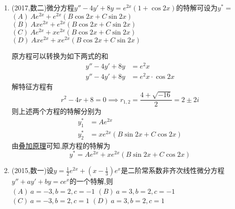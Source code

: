 \documentclass[12pt, a4paper, oneside, UTF8]{ctexbook}
\begin{document}
\begin{enumerate}[label=\arabic*.,start=8]
    \item (2017,数二)微分方程$y''-4y'+8y=e^{2x}(1+\cos2x)$的特解可设为$y^*=$ \\
        $(A)\ Ae^{2x}+e^{2x}(B\cos2x+C\sin2x)$ \\
        $(B)\ Axe^{2x}+e^{2x}(B\cos2x+C\sin2x)$ \\
        $(C)\ Ae^{2x}+xe^{2x}(B\cos2x+C\sin2x)$ \\
        $(D)\ Axe^{2x}+xe^{2x}(B\cos2x+C\sin2x)$
    
    \begin{solution}
    原方程可以转换为如下两式的和
    \begin{align}
        y'' - 4y' + 8y &= e^2x \\
        y'' - 4y' + 8y &= e^2x\cdot\cos{2x}
    \end{align}
    解特征方程有
    $$
    r^2-4r+8=0 \implies r_{1,2}=\frac{4+\sqrt{-16}}{2}=2\pm 2i
    $$
    则上述两个方程的特解分别为
    \begin{align*}
        y_1^{*} &=Ae^{2x} \\
        y_2^{*} &=xe^{2x}(B\sin{2x}+C\cos{2x}) 
    \end{align*}
    由\underline{叠加原理}可知,原方程的特解为
    $$
    y^{*}=Ae^{2x}+xe^{2x}(B\sin{2x}+C\cos{2x}) 
    $$
    \end{solution}
    
    \item (2015,数一)设$y=\frac{1}{2}e^{2x}+(x-\frac{1}{3})e^x$是二阶常系数非齐次线性微分方程$y''+ay'+by=ce^x$的一个特解,则 \\
    $(A)\ a=-3,b=2,c=-1$ \qquad
    $(B)\ a=3,b=2,c=-1$ \\
    $(C)\ a=-3,b=2,c=1$ \qquad
    $(D)\ a=3,b=2,c=1$ 
    

\end{enumerate}
\end{document}
